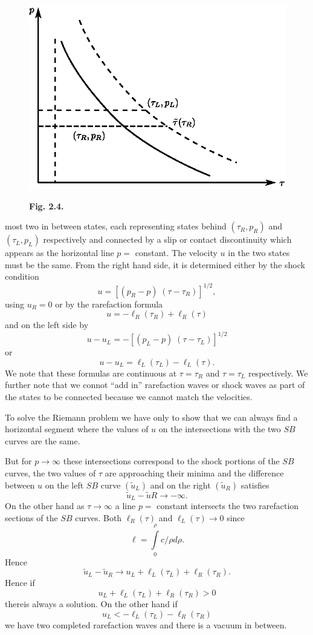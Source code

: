 \begin{figure}[H]
\centering
\includegraphics{figures/fig2.4.eps}
\centerline{\bf Fig. 2.4.} 
\end{figure}\pageoriginale
\noindent
most two in between states, each representing states behind $(\tau_R, p_R)$ and $(\tau_L, p_L)$ respectively and connected by a slip or contact discontinuity which appears as the horizontal line $p =$ constant. The velocity $u$ in the two states must be the same. From the right hand side, it is determined either by the shock condition
$$
u = [(p_R - p) \; (\tau - \tau_R)]^{1/2},
$$
using $u_R = 0$ or by the rarefaction formula
$$
u = - \ell_R(\tau_R) + \ell_R(\tau)
$$
and on the left side by
$$
u - u_L = - [(p_L - p) \; (\tau - \tau_L)]^{1/2}
$$\pageoriginale
or
$$
u - u_L = \ell_L (\tau_L) - \ell_L(\tau). 
$$
We note that these formulas are continuous at $\tau = \tau_R$ and $\tau = \tau_L$ respectively. We further note that we connot ``add in'' rarefaction waves or shock waves as part of the states to be connected because we cannot match the velocities.

To solve the Riemann problem we have only to show that we can always find a horizontal segment where the values of $u$ on the intersections with the two $SB$ curves are the same.

But for $p \to \infty$ these intersections correspond to the shock portions of the $SB$ curves, the two values of $\tau$ are approaching their minima and the difference between $u$ on the left $SB$ curve $(\tilde{u}_L)$ and on the right $(\tilde{u}_R)$ satisfies
$$
\tilde{u}_L - \tilde{u}R \to - \infty.
$$
On the other hand as $\tau \to \infty$ a line $p = $ constant intersects the two rarefaction sections of the $SB$ curves. Both $\ell_R(\tau)$ and $\ell_L(\tau) \to 0$ since
$$
\ell = \int\limits^\rho_0 c / \rho d \rho. 
$$
Hence
$$
\tilde{u}_L - \tilde{u}_R \to u_L + \ell_L (\tau_L) + \ell_R(\tau_R). 
$$
Hence if 
$$
u_L + \ell_L  (\tau_L) + \ell_R (\tau_R) > 0
$$
there\pageoriginale is always a solution. On the other hand if
$$
u_L < - \ell_L (\tau_L) - \ell_R (\tau_R) 
$$
we have two completed rarefaction waves and there is a vacuum in between.

